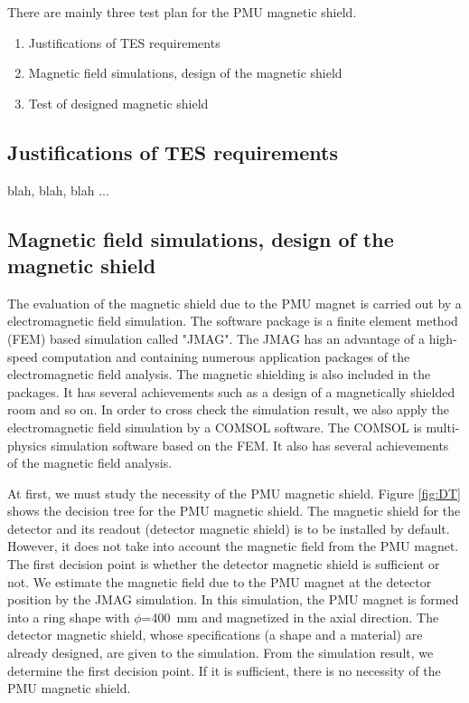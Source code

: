 \documentclass[11pt]{article}
\begin{document}
There are mainly three test plan for the PMU magnetic shield.
\begin{enumerate}
 \item Justifications of TES requirements
 \item Magnetic field simulations, design of the magnetic shield
 \item Test of designed magnetic shield
\end{enumerate}

\subsection{Justifications of TES requirements}

blah, blah, blah ...

\subsection{Magnetic field simulations, design of the magnetic shield}

The evaluation of the magnetic shield due to the PMU magnet is carried out by a electromagnetic field simulation.
The software package is a finite element method (FEM) based simulation called "JMAG".
The JMAG has an advantage of a high-speed computation and containing numerous application packages of the electromagnetic field analysis.
The magnetic shielding is also included in the packages.
It has several achievements such as a design of a magnetically shielded room and so on.
In order to cross check the simulation result, we also apply the electromagnetic field simulation by a COMSOL software.
The COMSOL is multi-physics simulation software based on the FEM.
It also has several achievements of the magnetic field analysis.

At first, we must study the necessity of the PMU magnetic shield.
Figure \ref{fig:DT} shows the decision tree for the PMU magnetic shield.
The magnetic shield for the detector and its readout (detector magnetic shield) is to be installed by default.
However, it does not take into account the magnetic field from the PMU magnet.
The first decision point is whether the detector magnetic shield is sufficient or not.
We estimate the magnetic field due to the PMU magnet at the detector position by the JMAG simulation.
In this simulation,  the PMU magnet is formed into a ring shape with $\phi$=400~mm and magnetized in the axial direction.
The detector magnetic shield, whose specifications (a shape and a material) are already designed, are given to the simulation.
From the simulation result, we determine the first decision point.
If it is sufficient, there is no necessity of the PMU magnetic shield.
\end{document}
